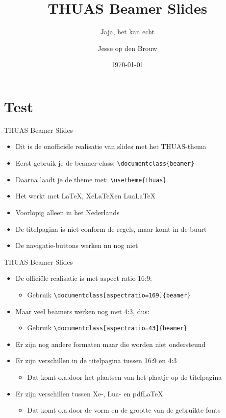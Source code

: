 \documentclass[fleqn,aspectratio=43]{beamer}
\title{THUAS Beamer Slides}
\subtitle{Jaja, het kan echt}
\author{Jesse op den Brouw}
\date{\today}
\begin{document}
\maketitle

\section{Test}

\begin{frame}[fragile]{THUAS Beamer Slides}
\begin{itemize}
\item Dit is de onofficiële realisatie van slides met het THUAS-thema
\item Eerst gebruik je de beamer-class: \lstinline|\documentclass{beamer}|
\item Daarna laadt je de theme met: \lstinline|\usetheme{thuas}|
\item Het werkt met \LaTeX, Xe\LaTeX en Lua\LaTeX
\item Voorlopig alleen in het Nederlands
\item De titelpagina is niet conform de regels, maar komt in de buurt
\item De navigatie-buttons werken nu nog niet
\end{itemize}
\end{frame}

\begin{frame}[fragile]{THUAS Beamer Slides}
\begin{itemize}
\item De officiële realisatie is met aspect ratio 16:9:
\begin{itemize}
\item Gebruik \lstinline|\documentclass[aspectratio=169]{beamer}|
\end{itemize}
\item Maar veel beamers werken nog met 4:3, dus:
\begin{itemize}
\item Gebruik \lstinline|\documentclass[aspectratio=43]{beamer}|
\end{itemize}
\item Er zijn nog andere formaten maar die worden niet ondersteund
\item Er zijn verschillen in de titelpagina tussen 16:9 en 4:3
\begin{itemize}
\item Dat komt o.a.\@ door het plaatsen van het plaatje op de titelpagina
\end{itemize}
\item Er zijn verschillen tussen Xe-, Lua- en pdf\LaTeX
\begin{itemize}
\item Dat komt o.a.\@ door de vorm en de grootte van de gebruikte fonts
\end{itemize}
\end{itemize}
\end{frame}
\end{document}
